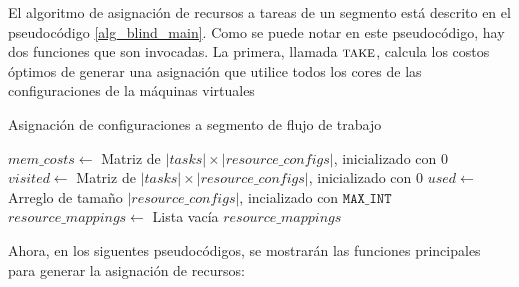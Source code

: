 El algoritmo de asignación de recursos a tareas de un segmento está descrito en el pseudocódigo \ref{alg_blind_main}. Como se puede notar en este pseudocódigo, hay dos funciones que son invocadas. La primera, llamada $\Call{take}{}$, calcula los costos óptimos de generar una asignación que utilice todos los cores de las configuraciones de la máquinas virtuales

\begin{algorithm}
\caption{Asignación de configuraciones a segmento de flujo de trabajo}
\label{alg_blind_main}
\begin{algorithmic}[1]

	\State $mem\_costs \gets$ Matriz de $|tasks| \times |resource\_configs|$, inicializado con 0 
	\State $visited \gets$ Matriz de $|tasks| \times |resource\_configs|$, inicializado con 0
	\State $used \gets$ Arreglo de tamaño $|resource\_configs|$, incializado con $\texttt{MAX\_INT}$
	\State $resource\_mappings \gets$ Lista vacía
	\State {}
	\State {}
	\State \Return $resource\_mappings$
\EndProcedure
\end{algorithmic}
\end{algorithm}


Ahora, en los siguentes pseudocódigos, se mostrarán las funciones principales para generar la asignación de recursos:

